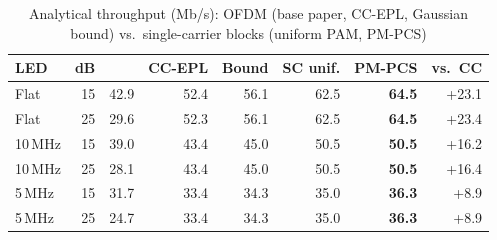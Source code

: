 \begin{table}[t]\centering\footnotesize\setlength{\tabcolsep}{2.6pt}
\caption{Analytical throughput (Mb/s): OFDM (base paper, CC-EPL, Gaussian bound) vs.\ single-carrier blocks (uniform PAM, PM-PCS)}\label{tab:pmmain}
\begin{tabular}{@{}lrrrrrrr@{}}\toprule
LED & dB & \cite{pham2026} & CC-EPL & Bound & SC unif. & \textbf{PM-PCS} & vs.\ CC \\\midrule
Flat & 15 & 42.9 & 52.4 & 56.1 & 62.5 & \textbf{64.5} & +23.1 \\
Flat & 25 & 29.6 & 52.3 & 56.1 & 62.5 & \textbf{64.5} & +23.4 \\
10\,MHz & 15 & 39.0 & 43.4 & 45.0 & 50.5 & \textbf{50.5} & +16.2 \\
10\,MHz & 25 & 28.1 & 43.4 & 45.0 & 50.5 & \textbf{50.5} & +16.4 \\
5\,MHz & 15 & 31.7 & 33.4 & 34.3 & 35.0 & \textbf{36.3} & +8.9 \\
5\,MHz & 25 & 24.7 & 33.4 & 34.3 & 35.0 & \textbf{36.3} & +8.9 \\
\bottomrule\end{tabular}\end{table}
